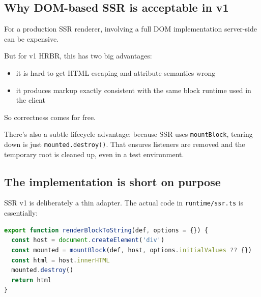\subsection{Why DOM-based SSR is acceptable in v1}

For a production SSR renderer, involving a full DOM implementation server-side can be expensive.

But for v1 HRBR, this has two big advantages:

\begin{itemize}
  \item it is hard to get HTML escaping and attribute semantics wrong
  \item it produces markup exactly consistent with the same block runtime used in the client
\end{itemize}

So correctness comes for free.

\begin{center}
\end{center}

There’s also a subtle lifecycle advantage: because SSR uses \texttt{mountBlock}, tearing down is just \texttt{mounted.destroy()}.
That ensures listeners are removed and the temporary root is cleaned up, even in a test environment.

\subsection{The implementation is short on purpose}

SSR v1 is deliberately a thin adapter.
The actual code in \texttt{runtime/ssr.ts} is essentially:

\begin{lstlisting}[language=JavaScript]
export function renderBlockToString(def, options = {}) {
  const host = document.createElement('div')
  const mounted = mountBlock(def, host, options.initialValues ?? {})
  const html = host.innerHTML
  mounted.destroy()
  return html
}
\end{lstlisting}

